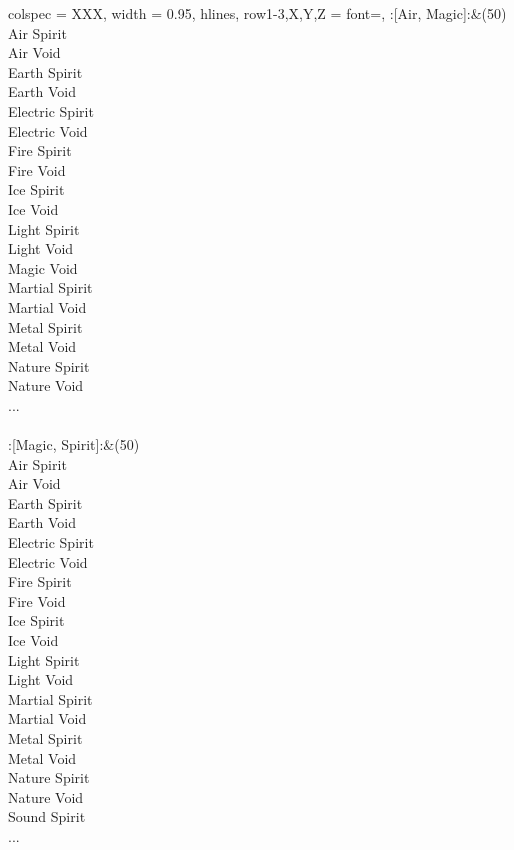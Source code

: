 \begin{longtblr}[
	caption = {2v2 Attacking Effective},
	label = {2v2-Attacking-Effective},
]{
	colspec = {XXX}, width = 0.95\linewidth,
	hlines,
	row{1-3,X,Y,Z} = {font=\bfseries},
}
	:[Air, Magic]:&{(50)\\
	Air Spirit \\
	Air Void \\
	Earth Spirit \\
	Earth Void \\
	Electric Spirit \\
	Electric Void \\
	Fire Spirit \\
	Fire Void \\
	Ice Spirit \\
	Ice Void \\
	Light Spirit \\
	Light Void \\
	Magic Void \\
	Martial Spirit \\
	Martial Void \\
	Metal Spirit \\
	Metal Void \\
	Nature Spirit \\
	Nature Void \\
	...\\
	}\\

	:[Magic, Spirit]:&{(50)\\
	Air Spirit \\
	Air Void \\
	Earth Spirit \\
	Earth Void \\
	Electric Spirit \\
	Electric Void \\
	Fire Spirit \\
	Fire Void \\
	Ice Spirit \\
	Ice Void \\
	Light Spirit \\
	Light Void \\
	Martial Spirit \\
	Martial Void \\
	Metal Spirit \\
	Metal Void \\
	Nature Spirit \\
	Nature Void \\
	Sound Spirit \\
	...\\
	}\\


\end{longtblr}
